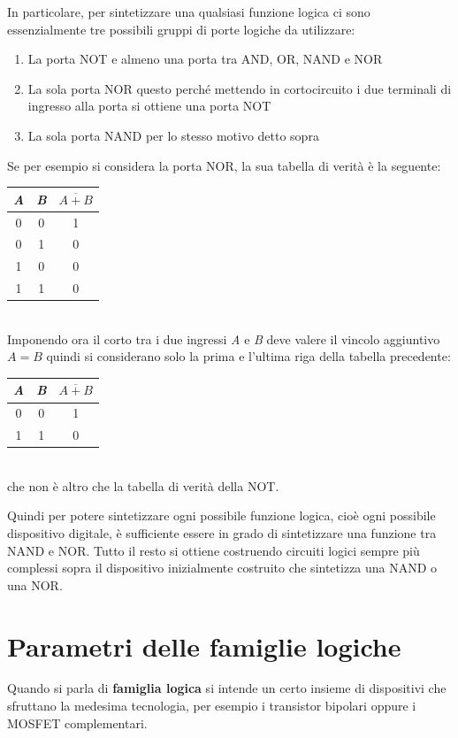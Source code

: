 \documentclass[12pt, a4paper]{report}
\begin{document}
In particolare, per sintetizzare una qualsiasi funzione logica ci sono essenzialmente tre possibili gruppi di porte logiche da utilizzare:
\begin{enumerate}
    \item La porta NOT e almeno una porta tra AND, OR, NAND e NOR
    \item La sola porta NOR questo perché mettendo in cortocircuito i due terminali di ingresso alla porta si ottiene una porta NOT
    \item La sola porta NAND per lo stesso motivo detto sopra
\end{enumerate}
Se per esempio si considera la porta NOR, la sua tabella di verità è la seguente:
\begin{table}[ht]
        \centering
        \begin{tabular}{c c |c}
        \em A &\em B &$\overline{A + B}$\\\hline
        0 &0 &1\\
        0 &1 &0\\
        1 &0 &0\\
        1 &1 &0
        \end{tabular}
\end{table}
\\Imponendo ora il corto tra i due ingressi \textit{A} e \textit{B} deve valere il vincolo aggiuntivo $A = B$ quindi si considerano solo la prima e l'ultima riga della tabella precedente:
\begin{table}[ht]
        \centering
        \begin{tabular}{c c |c}
        \em A &\em B &$\overline{A + B}$\\\hline
        0 &0 &1\\
        1 &1 &0
        \end{tabular}
\end{table}
\\che non è altro che la tabella di verità della NOT.

Quindi per potere sintetizzare ogni possibile funzione logica, cioè ogni possibile dispositivo digitale, è sufficiente essere in grado di sintetizzare una funzione tra NAND e NOR. Tutto il resto si ottiene costruendo circuiti logici sempre più complessi sopra il dispositivo inizialmente costruito che sintetizza una NAND o una NOR.

\section{Parametri delle famiglie logiche}
Quando si parla di \textbf{famiglia logica} si intende un certo insieme di dispositivi che sfruttano la medesima tecnologia, per esempio i transistor bipolari oppure i MOSFET complementari.
\end{document}
